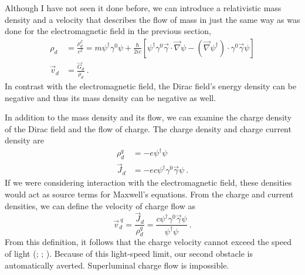\documentclass[onecolumn,secnumarabic,amsmath,amssymb,balancelastpage,nofootinbib]{article}
\begin{document}
Although I have not seen it done before, we can introduce a relativistic mass density and a velocity that describes the flow of mass in just the same way as was done for the electromagnetic field in the previous section,
\begin{align}
\rho_d&=\frac{\rho_d^{\mathcal{E}}}{c^2}=m \psi^\dagger\gamma^0\psi + \frac{\hbar}{2i c}\left[\psi^\dagger\gamma^0\vec{\gamma}\cdot\vec{\nabla}\psi-(\vec{\nabla} \psi^\dagger)\cdot\gamma^0\vec{\gamma}\psi\right] 
\label{diracmassdensity}
\\
\vec{v}_d&=\frac{\vec{G}_d}{\rho_d}\ .
\label{diracvelocity}
\end{align}
In contrast with the electromagnetic field, the Dirac field's energy density can be negative and thus its mass density can be negative as well.

In addition to the mass density and its flow, we can examine the charge density of the Dirac field and the flow of charge.  The charge density and charge current density are
\begin{align}
\rho^q_d&=-e \psi^\dagger \psi
\label{diracchargedensity}
\\
\vec{J}_d&=-e c \psi^\dagger \gamma^{0} \vec{\gamma} \psi
\label{diraccurrentdensity}\ .
\end{align}
If we were considering interaction with the electromagnetic field, these densities would act as source terms for Maxwell's equations.  From the charge and current densities, we can define the velocity of charge flow as
\begin{equation}
\vec{v}_d^{\:q}=\frac{\vec{J}_d}{\rho^q_d}=\frac{c \psi^\dagger \gamma^{0} \vec{\gamma} \psi}{\psi^\dagger \psi}\ .
\label{diracchargevelocity}
\end{equation}
From this definition, it follows that the charge velocity cannot exceed the speed of light (\citealp[section 2b]{takabayasi1957}; \citealp[section 10.4]{bohmhiley}; \citealp[section 12.2]{holland}).  Because of this light-speed limit, our second obstacle is automatically averted.  Superluminal charge flow is impossible.
\end{document}
